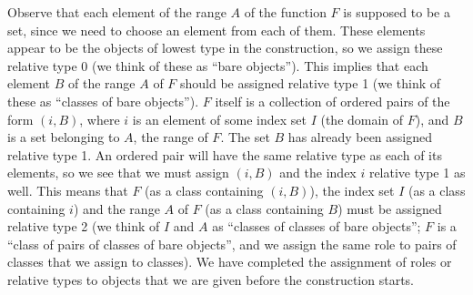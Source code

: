 Observe that each element of the range $A$ of the function $F$ is
supposed to be a set, since we need to choose an element from each of
them.  These elements appear to be the objects of lowest type in the
construction, so we assign these relative type 0 (we think of these as
``bare objects'').  This implies that each element $B$ of the range
$A$ of $F$ should be assigned relative type 1 (we think of these as
``classes of bare objects'').  $F$ itself is a collection of ordered
pairs of the form $(i,B)$, where $i$ is an element of some index set
$I$ (the domain of $F$), and $B$ is a set belonging to $A$, the range
of $F$.  The set $B$ has already been assigned relative type 1.  An
ordered pair will have the same relative type as each of its elements,
so we see that we must assign $(i,B)$ and the index $i$ relative type
1 as well.  This means that $F$ (as a class containing $(i,B)$), the
index set $I$ (as a class containing $i$) and the range $A$ of $F$ (as
a class containing $B$) must be assigned relative type 2 (we think of
$I$ and $A$ as ``classes of classes of bare objects''; $F$ is a
``class of pairs of classes of bare objects'', and we assign the same
role to pairs of classes that we assign to classes).  We have
completed the assignment of roles or relative types to objects that we
are given before the construction starts.

